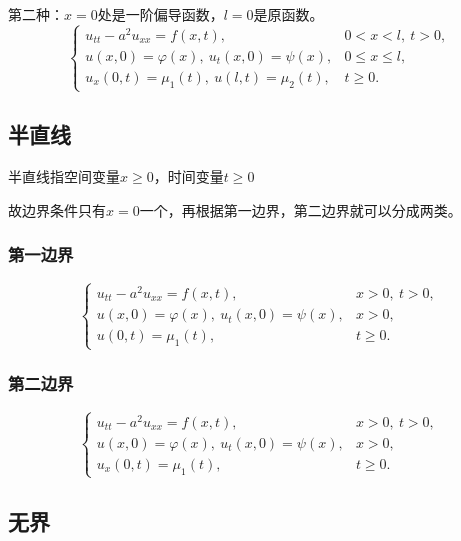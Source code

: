 \documentclass[12pt,a4paper]{article}
\numberwithin{subsection}{section}   %
\numberwithin{subsubsection}{subsection}
\theoremstyle{plain}
\theoremstyle{definition}
\theoremstyle{remark}
\theoremstyle{remark}
\begin{document}
			第二种：$x=0$处是一阶偏导函数，$ l=0$是原函数。
		\begin{equation}\label{The bounded wave equation with mixed boundary conditions_2}
			\begin{cases}
				u_{tt} - a^2 u_{xx} = f(x, t), & 0 < x < l, \ t > 0, \\
				u(x, 0) = \varphi(x), \ u_t(x, 0) = \psi(x), & 0 \leq x \leq l, \\
				u_x(0, t) = \mu_1(t), \ u(l, t) = \mu_2(t), & t \geq 0.
			\end{cases}
				\end{equation}
				
		
		
\subsection{半直线}
半直线指空间变量$x \geq 0$，时间变量$t \geq 0$

故边界条件只有$x=0$一个，再根据第一边界，第二边界就可以分成两类。
\subsubsection{第一边界}
\begin{equation}\label{The wave equation on a half-line with Dirichlet boundary conditions}
	\begin{cases}
		u_{tt} - a^2 u_{xx} = f(x, t), & x > 0, \ t > 0, \\
		u(x, 0) = \varphi(x), \ u_t(x, 0) = \psi(x), & x > 0, \\
     	u(0, t) = \mu_1(t), & t \geq 0.
	\end{cases}
	\end{equation}
	
\subsubsection{第二边界}
\begin{equation}\label{The wave equation on a half-line with Neumann boundary conditions}
	\begin{cases}
		u_{tt} - a^2 u_{xx} = f(x, t), &  x > 0, \ t > 0, \\
		u(x, 0) = \varphi(x), \ u_t(x, 0) = \psi(x), & x > 0, \\
		u_x(0, t) = \mu_1(t), & t \geq 0.
	\end{cases}
	\end{equation}

	\subsection{无界}
	
\end{document}
